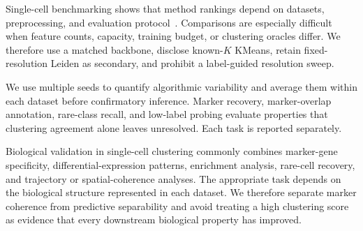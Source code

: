 Single-cell benchmarking shows that method rankings depend on datasets,
preprocessing, and evaluation protocol~\cite{xu2026scclubench}.  Comparisons are
especially difficult when feature counts, capacity, training budget, or
clustering oracles differ.  We therefore use a matched backbone, disclose
known-$K$ KMeans, retain fixed-resolution Leiden as secondary, and prohibit a
label-guided resolution sweep.

We use multiple seeds to quantify algorithmic variability and average them
within each dataset before confirmatory inference. Marker recovery,
marker-overlap annotation, rare-class recall, and low-label probing evaluate
properties that clustering agreement alone leaves unresolved. Each task is
reported separately.

Biological validation in single-cell clustering commonly combines marker-gene
specificity, differential-expression patterns, enrichment analysis, rare-cell
recovery, and trajectory or spatial-coherence analyses. The appropriate task
depends on the biological structure represented in each dataset. We therefore
separate marker coherence from predictive separability and avoid treating a
high clustering score as evidence that every downstream biological property
has improved.
